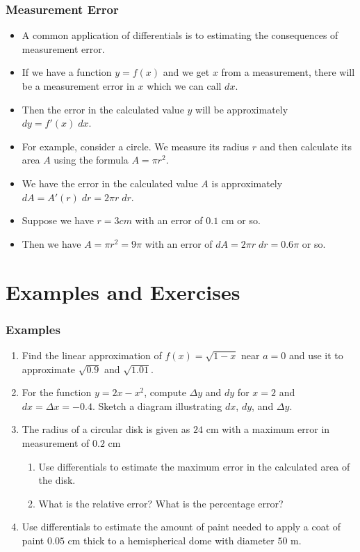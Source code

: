 \documentclass[serif,ignorenonframetext]{beamer}
\begin{document}
\begin{frame}
  \frametitle{Measurement Error}
  \begin{itemize}[<+->]
  \item A common application of differentials is to estimating the
    consequences of measurement error.
  \item If we have a function $y=f(x)$ and we get $x$ from a measurement,
    there will be a measurement error in $x$ which we can call $dx$.
  \item Then the error in the calculated value $y$ will be approximately
    $dy=f'(x) \; dx$.
  \item For example, consider a circle.  We measure its radius $r$
    and then calculate its area $A$ using the formula $A=\pi r^2$.
  \item We have the error in the calculated value $A$ is approximately
    $dA = A'(r) \; dr = 2\pi r \; dr$.
  \item Suppose we have $r=3 cm$ with an error of $0.1$ cm or so.
  \item Then we have $A=\pi r^2 = 9\pi$ with an error of
    $dA = 2\pi r \; dr = 0.6 \pi$ or so.
  \end{itemize}
\end{frame}


\section{Examples and Exercises}

\begin{frame}
  \frametitle{Examples}
  \begin{enumerate}
  \item Find the linear approximation of $f(x)=\sqrt{1-x}$ near $a=0$
    and use it to approximate $\sqrt{0.9}$ and $\sqrt{1.01}$.
  \item For the function $y=2x-x^2$, compute $\Delta y$ and $dy$ for
    $x=2$ and $dx=\Delta x=-0.4$.  Sketch a diagram illustrating $dx$,
    $dy$, and $\Delta y$.
  \item The radius of a circular disk is given as $24$ cm with a maximum
    error in measurement of $0.2$ cm
    \begin{enumerate}
    \item Use differentials to estimate the maximum error in the calculated
      area of the disk.
    \item What is the relative error?  What is the percentage error?
    \end{enumerate}
  \item Use differentials to estimate the amount of paint needed to
    apply a coat of paint $0.05$ cm thick to a hemispherical dome with
    diameter $50$ m.
  \end{enumerate} 
\end{frame}
\end{document}
